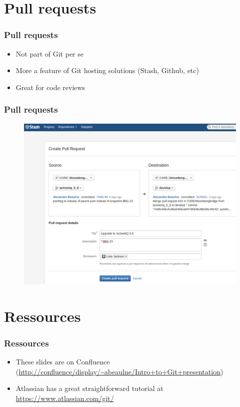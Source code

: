 \documentclass{beamer}
\begin{document}
\section{Pull requests}

\begin{frame}
    \frametitle{Pull requests}
    \begin{itemize}
        \item Not part of Git per se
        \item More a feature of Git hosting solutions (Stash, Github, etc)
        \item Great for code reviews
    \end{itemize}
\end{frame}

\begin{frame}
    \frametitle{Pull requests}
    \begin{figure}[h!]
        \begin{center}
            \includegraphics[scale=0.25]{pull_request.png}
        \end{center}
    \end{figure}
\end{frame}

\section{Ressources}

\begin{frame}
    \frametitle{Ressources}
    \begin{itemize}
        \item These slides are on Confluence (\url{http://confluence/display/~abeaulne/Intro+to+Git+presentation})
        \item Atlassian has a great straightforward tutorial at \url{https://www.atlassian.com/git/}
    \end{itemize}
\end{frame}
\end{document}
